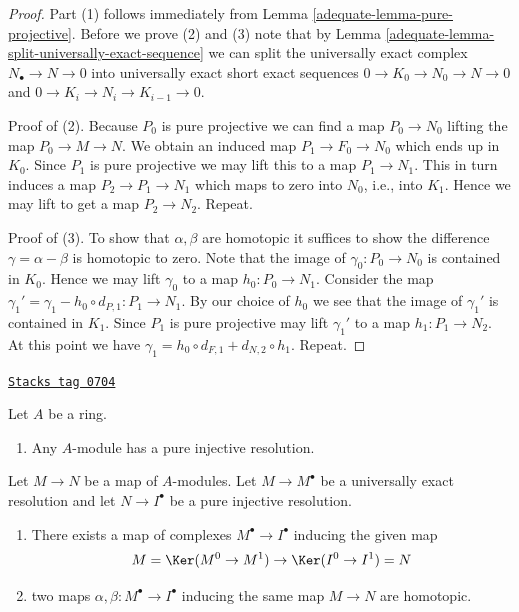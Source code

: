 \begin{proof}

Part (1) follows immediately from
Lemma \ref{adequate-lemma-pure-projective}.
Before we prove (2) and (3) note that by
Lemma \ref{adequate-lemma-split-universally-exact-sequence}
we can split the universally exact complex $N_\bullet \to N \to 0$
into universally exact short exact sequences $0 \to K_0 \to N_0 \to N \to 0$
and $0 \to K_i \to N_i \to K_{i - 1} \to 0$.

\medskip\noindent
Proof of (2). Because $P_0$ is pure projective
we can find a map $P_0 \to N_0$ lifting the map $P_0 \to M \to N$.
We obtain an induced map $P_1 \to F_0 \to N_0$ which ends up in $K_0$.
Since $P_1$ is pure projective we may lift this
to a map $P_1 \to N_1$. This in turn induces a map
$P_2 \to P_1 \to N_1$ which maps to zero into
$N_0$, i.e., into $K_1$. Hence we may lift to get a map
$P_2 \to N_2$. Repeat.

\medskip\noindent
Proof of (3). To show that $\alpha, \beta$ are homotopic it suffices
to show the difference $\gamma = \alpha - \beta$ is homotopic
to zero. Note that the image of $\gamma_0 : P_0 \to N_0$
is contained in $K_0$. Hence we may lift
$\gamma_0$ to a map $h_0 : P_0 \to N_1$. Consider the map
$\gamma_1' = \gamma_1 - h_0 \circ d_{P, 1} : P_1 \to N_1$.
By our choice of $h_0$ we see that the image of $\gamma_1'$
is contained in $K_1$. Since $P_1$ is pure projective may lift
$\gamma_1'$ to a map $h_1 : P_1 \to N_2$. At this point we have
$\gamma_1 = h_0 \circ d_{F, 1} + d_{N, 2} \circ h_1$. Repeat.
\end{proof}

\begin{lemma}
\label{adequate-lemma-pure-injective-resolutions}
\href{https://stacks.math.columbia.edu/tag/0704}{\texttt{Stacks tag 0704}}

Let $A$ be a ring.
\begin{enumerate}
\item Any $A$-module has a pure injective resolution.
\end{enumerate}
Let $M \to N$ be a map of $A$-modules.
Let $M \to M^\bullet$ be a universally exact resolution and
let $N \to I^\bullet$ be a pure injective resolution.
\begin{enumerate}
\item[(2)] There exists a map of complexes $M^\bullet \to I^\bullet$
inducing the given map
$$
M = \Ker(M^0 \to M^1) \to \Ker(I^0 \to I^1) = N
$$
\item[(3)] two maps $\alpha, \beta : M^\bullet \to I^\bullet$
inducing the same map $M \to N$ are homotopic.
\end{enumerate}
\end{lemma}

